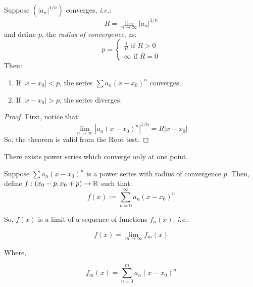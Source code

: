 \begin{theorem}
    Suppose $(|a_n|^{1/n})$ converges, \emph{i.e.}:
    \begin{equation*}
        R = \lim \limits_{n \to \infty} |a_n|^{1/n}
    \end{equation*}
    and define $p$, the \emph{radius of convergence}, as:
    \begin{equation*}
        p = \begin{cases}
            \frac{1}{R} \text{ if } R > 0 \\
            \infty \text{ if } R = 0
        \end{cases}
    \end{equation*}
    Then:
    \begin{enumerate}
        \item If $|x-x_0| < p$, the series $\sum a_n(x - x_0)^n$ converges;
        \item If $|x-x_0| > p$, the series diverges.
    \end{enumerate}
\end{theorem}

\begin{proof}
    First, notice that:
    \begin{equation*}
        \lim \limits_{n \to \infty} |a_n(x-x_0)^n|^{1/n} = R |x-x_0|
    \end{equation*}
    So, the theorem is valid from the Root test.
\end{proof}

\begin{remark}
    There exists power series which converge only at one point.
\end{remark}

Suppose $\sum a_n(x-x_0)^n$ is a power series with radius of convergence $p$. Then, define $f: (x_0 - p, x_0 + p) \to \mathbb{R}$ such that:
\begin{equation*}
    f(x) := \sum \limits_{n=0}^\infty a_n (x - x_0)^n
\end{equation*}

So, $f(x)$ is a limit of a sequence of functions $f_n(x)$, \emph{i.e.}:

\begin{equation*}
    f(x) = \lim \limits_{m \to \infty} f_m(x)
\end{equation*}

Where,

\begin{equation*}
    f_m(x) = \sum \limits_{n=0}^m a_n(x-x_0)^n
\end{equation*}

